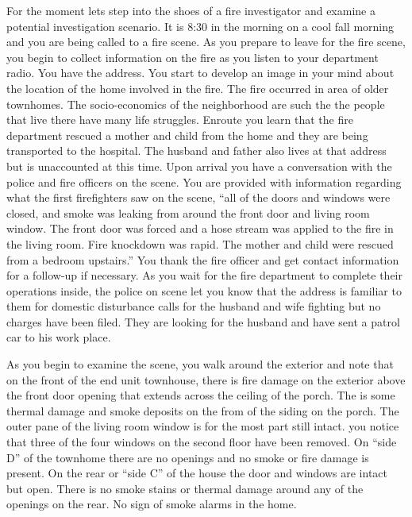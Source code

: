 \documentclass[twoside]{uocthesis}
\begin{document}
{For the moment lets step into the shoes of a fire investigator and examine a potential investigation scenario.  It is 8:30 in the morning on a cool fall morning and you are being called to a fire scene.  As you prepare to leave for the fire scene, you begin to collect information on the fire as you listen to your department radio.  You have the address.  You start to develop an image in your mind about the location of the home involved in the fire. The fire occurred in area of older townhomes.  The socio-economics of the neighborhood are such the the people that live there have many life struggles. Enroute you learn that the fire department rescued a mother and child from the home and they are being transported to the hospital.  The husband and father also lives at that address but is unaccounted at this time.  Upon arrival you have a conversation with the police and fire officers on the scene.  You are provided with information regarding what the first firefighters saw on the scene, ``all of the doors and windows were closed, and smoke was leaking from around the front door and living room window.  The front door was forced and a hose stream was applied to the fire in the living room.  Fire knockdown was rapid.  The mother and child were rescued from a bedroom upstairs.''  You thank the fire officer and get contact information for a follow-up if necessary.  As you wait for the fire department to complete their operations inside, the police on scene let you know that the address is familiar to them for domestic disturbance calls for the husband and wife fighting but no charges have been filed.  They are looking for the husband and have sent a patrol car to his work place.  

As you begin to examine the scene, you walk around the exterior and note that on the front of the end unit townhouse, there is fire damage on the exterior above the front door opening that extends across the ceiling of the porch.  The is some thermal damage and smoke deposits on the from of the siding on the porch.  The outer pane of the living room window is for the most part still intact. you notice that three of the four windows on the second floor have been removed.  On ``side D'' of the townhome there are no openings and no smoke or fire damage is present.  On the rear or ``side C'' of the house the door and windows are intact but open.  There is no smoke stains or thermal damage around any of the openings on the rear. No sign of smoke alarms in the home.

}
\end{document}

